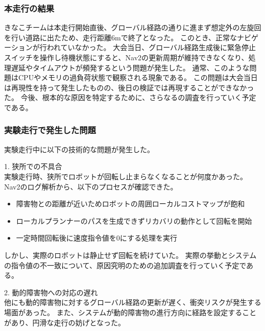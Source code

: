 \subsubsection{本走行の結果}
きなこチームは本走行開始直後、グローバル経路の通りに進まず想定外の左旋回を行い道路に出たため、走行距離6mで終了となった。
このとき、正常なナビゲーションが行われていなかった。
大会当日、グローバル経路生成後に緊急停止スイッチを操作し待機状態にすると、Nav2の更新周期が維持できなくなり、処理遅延やタイムアウトが頻発するという問題が発生した。
通常、このような問題はCPUやメモリの過負荷状態で観察される現象である。
この問題は大会当日は再現性を持って発生したものの、後日の検証では再現することができなかった。
今後、根本的な原因を特定するために、さらなるの調査を行っていく予定である。

\subsubsection{実験走行で発生した問題}
実験走行中に以下の技術的な問題が発生した。

1. 狭所での不具合\\
実験走行時、狭所でロボットが回転し止まらなくなることが何度かあった。
Nav2のログ解析から、以下のプロセスが確認できた。

\begin{itemize}
  \item 障害物との距離が近いためロボットの周囲ローカルコストマップが飽和
  \item ローカルプランナーのパスを生成できずリカバリの動作として回転を開始
  \item  一定時間回転後に速度指令値を0にする処理を実行
\end{itemize}

しかし、実際のロボットは静止せず回転を続けていた。
実際の挙動とシステムの指令値の不一致について、原因究明のための追加調査を行っていく予定である。

2. 動的障害物への対応の遅れ\\
他にも動的障害物に対するグローバル経路の更新が遅く、衝突リスクが発生する場面があった。
また、システムが動的障害物の進行方向に経路を設定することがあり、円滑な走行の妨げとなった。